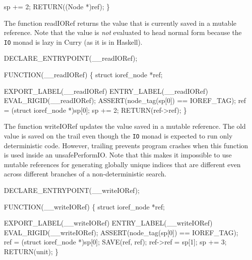     sp += 2;
    RETURN((Node *)ref);
\}

\nwendcode{}\nwdocspar
The function {\Tt{}readIORef\nwendquote} returns the value that is currently saved
in a mutable reference. Note that the value is \emph{not} evaluated
to head normal form because the \texttt{IO} monad is lazy in Curry
(as it is in Haskell).

\nwenddocs{}\plusendmoddef\nwstartdeflinemarkup{}\nwenddeflinemarkup
DECLARE_ENTRYPOINT(__readIORef);

FUNCTION(__readIORef)
\{
    struct ioref_node *ref;

   EXPORT_LABEL(__readIORef)
 ENTRY_LABEL(__readIORef)
    EVAL_RIGID(__readIORef);
    ASSERT(node_tag(sp[0]) == IOREF_TAG);
    ref = (struct ioref_node *)sp[0];
    sp += 2;
    RETURN(ref->ref);
\}

\nwendcode{}\nwdocspar
The function {\Tt{}writeIORef\nwendquote} updates the value saved in a mutable
reference. The old value is saved on the trail even though the
\texttt{IO} monad is expected to run only deterministic code. However,
trailing prevents program crashes when this function is used inside an
{\Tt{}unsafePerformIO\nwendquote}. Note that this makes it impossible to use mutable
references for generating globally unique indices that are different
even across different branches of a non-deterministic search.

\nwenddocs{}\plusendmoddef\nwstartdeflinemarkup{}\nwenddeflinemarkup
DECLARE_ENTRYPOINT(__writeIORef);

FUNCTION(__writeIORef)
\{
    struct ioref_node *ref;

    EXPORT_LABEL(__writeIORef)
 ENTRY_LABEL(__writeIORef)
    EVAL_RIGID(__writeIORef);
    ASSERT(node_tag(sp[0]) == IOREF_TAG);
    ref = (struct ioref_node *)sp[0];
    SAVE(ref, ref);
    ref->ref = sp[1];
    sp += 3;
    RETURN(unit);
\}
\nwendcode{}

%

